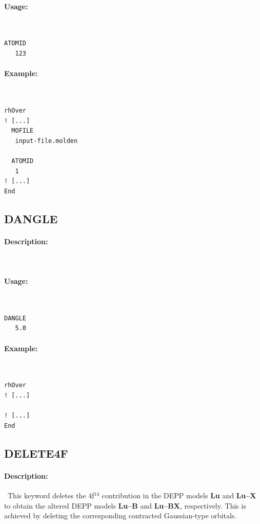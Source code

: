 \documentclass[11pt]{article}
\begin{document}
\paragraph{Usage:}~ 

\begin{lstlisting}[frame=single]
  ATOMID
   123
\end{lstlisting}

\paragraph{Example:}~ 

\begin{lstlisting}[frame=single]
rhOver
! [...]
  MOFILE
   input-file.molden
  
  ATOMID
   1
! [...]
End
\end{lstlisting}


\clearpage
\subsection{DANGLE}

\paragraph{Description:}~

\paragraph{Usage:}~ 

\begin{lstlisting}[frame=single]
  DANGLE
   5.0
\end{lstlisting}

\paragraph{Example:}~ 

\begin{lstlisting}[frame=single]
rhOver
! [...]

! [...]
End
\end{lstlisting}

\clearpage
\subsection{DELETE4F}

\paragraph{Description:}~This keyword deletes the 4f$^{14}$ contribution in the DEPP models \textbf{Lu} and \textbf{Lu--X} to obtain the altered DEPP models \textbf{Lu--B} and \textbf{Lu--BX}, respectively. This is achieved by deleting the corresponding contracted Gaussian-type orbitals.
\end{document}
